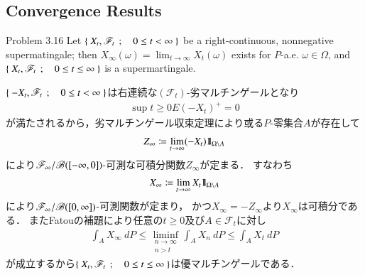 \subsection{Convergence Results}
	\begin{itembox}[l]{Problem 3.16}
		Let $\left\{\ X_t,\mathscr{F}_t\ \, ; \quad 0 \leq t < \infty\ \right\}$ be a right-continuous, nonnegative
		supermatingale; then $X_\infty(\omega) = \lim_{t \to \infty} X_t(\omega)$ exists for
		$P$-a.e. $\omega \in \Omega$, and $\left\{\ X_t,\mathscr{F}_t\ \, ; \quad 0 \leq t \leq \infty\ \right\}$ is a supermartingale.
	\end{itembox}
	
	\begin{prf}
		$\left\{\ -X_t,\mathscr{F}_t\ \, ; \quad 0 \leq t < \infty\ \right\}$は右連続な$(\mathscr{F}_t)$-劣マルチンゲールとなり
		\begin{align}
			\sup{t \geq 0}{E(-X_t)^+} = 0
		\end{align}
		が満たされるから，劣マルチンゲール収束定理により或る$P$-零集合$A$が存在して
		\begin{align}
			Z_\infty \coloneqq \lim_{t \to \infty} (-X_t)\mbox{1}\hspace{-0.25em}\mbox{l}_{\Omega \backslash A}
		\end{align}
		により$\mathscr{F}_\infty/\mathscr{B}([-\infty,0])$-可測な可積分関数$Z_\infty$が定まる．
		すなわち
		\begin{align}
			X_\infty \coloneqq \lim_{t \to \infty} X_t\mbox{1}\hspace{-0.25em}\mbox{l}_{\Omega \backslash A}
		\end{align}
		により$\mathscr{F}_\infty/\mathscr{B}([0,\infty])$-可測関数が定まり，
		かつ$X_\infty = -Z_\infty$より$X_\infty$は可積分である．
		またFatouの補題により任意の$t \geq 0$及び$A \in \mathscr{F}_t$に対し
		\begin{align}
			\int_A X_\infty\ dP \leq \liminf_{\substack{n \to \infty \\ n > t}} \int_A X_n\ dP \leq \int_A X_t\ dP
		\end{align}
		が成立するから$\left\{\ X_t,\mathscr{F}_t\ \, ; \quad 0 \leq t \leq \infty\ \right\}$は優マルチンゲールである．
		\QED
	\end{prf}
	
